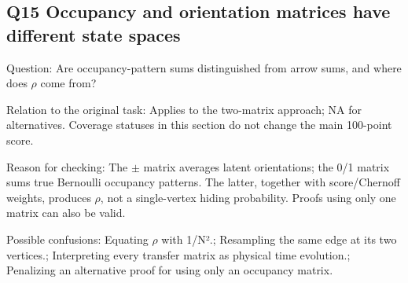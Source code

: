 \documentclass[11pt,a4paper]{article}
\begin{document}
\clearpage
\subsection{Q15 Occupancy and orientation matrices have different state spaces}
\label{aspect:Q15}
Question: Are occupancy-pattern sums distinguished from arrow sums,\allowbreak{} and where does \ensuremath{\rho} come from?

Relation to the original task: Applies to the two-matrix approach; NA for alternatives. Coverage statuses in this section do not change the main 100-point score.

Reason for checking: The \ensuremath{\pm} matrix averages latent orientations; the 0/\allowbreak{}1 matrix sums true Bernoulli occupancy patterns. The latter,\allowbreak{} together with score/\allowbreak{}Chernoff weights,\allowbreak{} produces \ensuremath{\rho},\allowbreak{} not a single-vertex hiding probability. Proofs using only one matrix can also be valid.

Possible confusions: Equating \ensuremath{\rho} with 1/\allowbreak{}N².; Resampling the same edge at its two vertices.; Interpreting every transfer matrix as physical time evolution.; Penalizing an alternative proof for using only an occupancy matrix.
\end{document}
